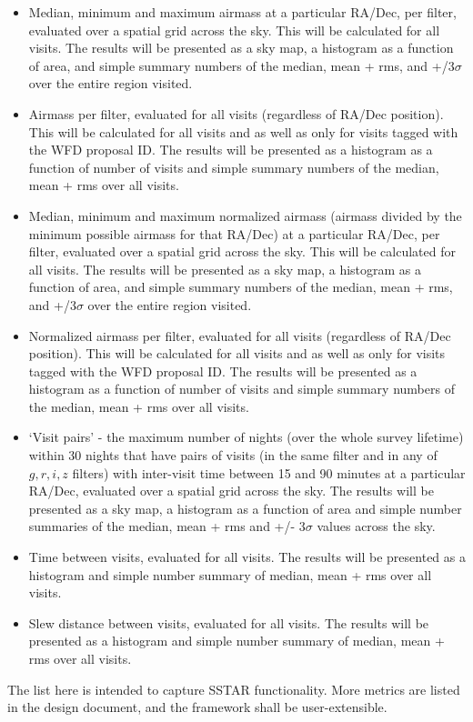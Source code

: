 \documentclass[11pt, preprint]{aastex}
\begin{document}
\begin{enumerate}
{\begin{itemize}
\item{Median, minimum and maximum airmass at a particular RA/Dec, per filter, evaluated over a spatial
grid across the sky. This will be calculated for all visits. The results
will be presented as a sky map, a histogram as a function of area, and simple summary numbers of the median, mean + rms,
and +/3$\sigma$ over the entire region visited.}
\item{Airmass per filter, evaluated for all visits (regardless of RA/Dec position). This will be calculated for all
visits and as well as only for visits tagged with the WFD proposal ID. The results will be presented as a histogram as a function of number of visits and simple summary numbers of the median, mean + rms over all visits.}
\item{Median, minimum and maximum normalized airmass (airmass divided by the minimum possible airmass for that RA/Dec) at a particular RA/Dec, per filter, evaluated over a spatial grid across the sky. This will be calculated for all visits. The results
will be presented as a sky map, a histogram as a function of area, and simple summary numbers of the median, mean + rms,
and +/3$\sigma$ over the entire region visited.}
\item{Normalized airmass per filter, evaluated for all visits (regardless of RA/Dec position). This will be calculated for all
visits and as well as only for visits tagged with the WFD proposal ID. The results will be presented as a histogram as a function of number of visits and simple summary numbers of the median, mean + rms over all visits.}
\item{`Visit pairs' - the maximum number of nights (over the whole survey lifetime) within 30 nights that have pairs of visits (in the same filter and in any of $g,r,i,z$ filters) with inter-visit time between 15 and 90 minutes at a particular RA/Dec, evaluated over a spatial grid across the sky. The results will be presented as a sky map, a histogram as a function of area and simple number summaries of the median, mean + rms and +/- 3$\sigma$ values across the sky.}
\item{Time between visits, evaluated for all visits. The results will be presented as a histogram and simple number summary of median, mean + rms over all visits.}
\item{Slew distance between visits, evaluated for all visits. The results will be presented as a histogram and simple number summary of median, mean + rms over all visits.}
\end{itemize}
The list here is intended to capture SSTAR functionality. More metrics are listed in the design document, and the framework shall 
be user-extensible. 
}
\end{enumerate}
\end{document}
